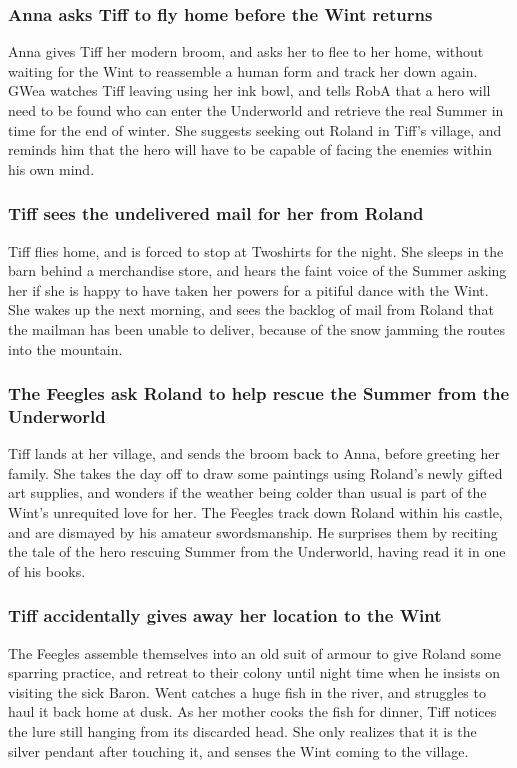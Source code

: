 \subsubsection{\Gls{Anna} asks \Gls{Tiff} to fly home before the \Gls{Wint} returns}
\Gls{Anna} gives \Gls{Tiff} her modern broom, and asks her to flee to her home, without waiting for
the \Gls{Wint} to reassemble a human form and track her down again. \Gls{GWea} watches \Gls{Tiff}
leaving using her ink bowl, and tells \Gls{RobA} that a hero will need to be found who can enter the
Underworld and retrieve the real \Gls{Summer} in time for the end of winter. She suggests seeking
out \Gls{Roland} in \Gls{Tiff}'s village, and reminds him that the hero will have to be capable of
facing the enemies within his own mind.

\subsubsection{\Gls{Tiff} sees the undelivered mail for her from \Gls{Roland}}
\Gls{Tiff} flies home, and is forced to stop at Twoshirts for the night. She sleeps in the barn
behind a merchandise store, and hears the faint voice of the \Gls{Summer} asking her if she is
happy to have taken her powers for a pitiful dance with the \Gls{Wint}. She wakes up the next
morning, and sees the backlog of mail from \Gls{Roland} that the mailman has been unable to deliver,
because of the snow jamming the routes into the mountain.

\subsubsection{The Feegles ask \Gls{Roland} to help rescue the \Gls{Summer} from the Underworld}
\Gls{Tiff} lands at her village, and sends the broom back to \Gls{Anna}, before greeting her
family. She takes the day off to draw some paintings using \Gls{Roland}'s newly gifted art supplies,
and wonders if the weather being colder than usual is part of the \Gls{Wint}'s unrequited love for
her. The Feegles track down \Gls{Roland} within his castle, and are dismayed by his amateur
swordsmanship. He surprises them by reciting the tale of the hero rescuing \Gls{Summer} from the
Underworld, having read it in one of his books.

\subsubsection{\Gls{Tiff} accidentally gives away her location to the \Gls{Wint}}
The Feegles assemble themselves into an old suit of armour to give \Gls{Roland} some sparring
practice, and retreat to their colony until night time when he insists on visiting the sick
\Gls{Baron}. \Gls{Went} catches a huge fish in the river, and struggles to haul it back home at
dusk. As her mother cooks the fish for dinner, \Gls{Tiff} notices the lure still hanging from its
discarded head. She only realizes that it is the silver pendant after touching it, and senses the
\Gls{Wint} coming to the village.

